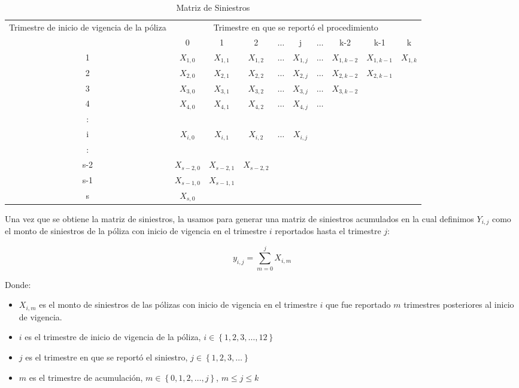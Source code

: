 \documentclass[11pt,twoside,openright,spanish]{report}
\numberwithin{equation}{chapter}
\numberwithin{figure}{chapter}
\numberwithin{table}{chapter}
\begin{document}
	\begin{table}[ht]
	\centering
		\caption{Matriz de Siniestros}
	\begin{tabularx}{\linewidth}{c|ccccccccc}
		\multirow{2}{4cm}{Trimestre de inicio de vigencia de la póliza} & \multicolumn{9}{c}{Trimestre en que se reportó el procedimiento} \\
			& 0  & 1 & 2 & $ \dots $ & j & $\dots $ & k-2 & k-1 &  k \\
		\midrule
		1      &  $X_{1,0}^{}$ & $X_{1,1}^{}$ & $X_{1,2}^{}$ & $ \dots $ & $X_{1,j}^{}$ & $ \dots $ & $X_{1,k-2}^{}$ & $X_{1,k-1}^{}$ & $X_{1,k}^{}$ \\
		2      &  $X_{2,0}^{}$ & $X_{2,1}^{}$ & $X_{2,2}^{}$ & $ \dots $ & $X_{2,j}^{}$ & $ \dots $ & $X_{2,k-2}^{}$ & $X_{2,k-1}^{}$ & \\
		3      &  $X_{3,0}^{}$ & $X_{3,1}^{}$ & $X_{3,2}^{}$ & $ \dots $ & $X_{3,j}^{}$ & $ \dots $ & $X_{3,k-2}^{}$ & & \\
		4      &  $X_{4,0}^{}$ & $X_{4,1}^{}$ & $X_{4,2}^{}$ & $ \dots $ & $X_{4,j}^{}$ & $ \dots $ & & & \\
		:      & & & & & & & & &\\
		i      &  $X_{i,0}^{}$ & $X_{i,1}^{}$ & $X_{i,2}^{}$ & $ \dots $ & $X_{i,j}^{}$ & & & & \\
		:      & & & & & & & & & \\
		s-2      &  $X_{s-2,0}^{}$ & $X_{s-2,1}^{}$ & $X_{s-2,2}^{}$ & & & & & & \\
		s-1      &  $X_{s-1,0}^{}$ & $X_{s-1,1}^{}$ & & & & & & & \\
		s      &  $X_{s,0}^{}$ & & & & & & & & \\
	\end{tabularx}
	\end{table}

	\vspace{1cm}

	Una vez que se obtiene la matriz de siniestros, la usamos para generar una matriz de siniestros acumulados en la cual definimos ${Y}_{i,j}$ como el monto de siniestros de la póliza con inicio de vigencia en el trimestre $i$ reportados hasta el trimestre $j$:
	
	$${y}_{i,j}=\sum _{m=0}^{j}{X}_{i,m}$$
	
	Donde:
	
	\begin{itemize}
		\item ${X}_{i,m}$ es el monto de siniestros de las pólizas con inicio de vigencia en el trimestre $i$ que fue reportado $m$ trimestres posteriores al inicio de vigencia.
		\item $i$ es el trimestre de inicio de vigencia de la póliza, $i\in \left\{1,2,3,\dots ,12\right\}$
		\item $j$ es el trimestre en que se reportó el siniestro,  $j\in \left\{1,2,3,\dots\right\}$
		\item $m$ es el trimestre de acumulación, $m\in \left\{0,1,2,\dots ,j\right\}$, $m\le j\le k$
	\end{itemize} 
	
\end{document}
